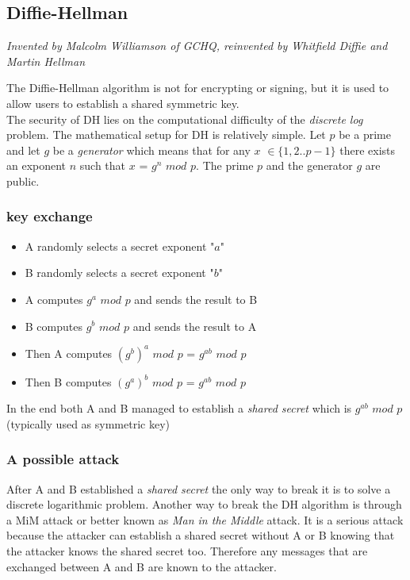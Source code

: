\documentclass{article}
\begin{document}
\subsection{Diffie-Hellman}
\begin{center}
   \textit{Invented by Malcolm Williamson of GCHQ, reinvented by Whitfield Diffie and Martin Hellman}
\end{center}
The Diffie-Hellman algorithm is not for encrypting or signing, but it is used to allow users to establish a shared symmetric key.\\
The security of DH lies on the computational difficulty of the \textit{discrete log} problem. The mathematical setup for DH is relatively simple. Let $p$ be a prime and let $g$ be a \textit{generator} which means that for any $x$ $\in \{1,2..p-1\}$ there exists an exponent $n$ such that $x$ = $g^n$ $mod$ $p$. The prime $p$ and the generator $g$ are public.

\subsubsection{key exchange}
\begin{itemize}
\item A randomly selects a secret exponent "$a$"
\item B randomly selects a secret exponent "$b$"
\item A computes $g^a$ $mod$ $p$ and sends the result to B
\item B computes $g^b$ $mod$ $p$ and sends the result to A
\item Then A computes $(g^b)^a$ $mod$ $p$ = $g^{ab}$ $mod$ $p$
\item Then B computes $(g^a)^b$ $mod$ $p$ = $g^{ab}$ $mod$ $p$
\end{itemize}{}
In the end both A and B managed to establish a \textit{shared secret} which is $g^{ab}$ $mod$ $p$ (typically used as symmetric key)

\subsubsection{A possible attack}
After A and B established a \textit{shared secret} the only way to break it is to solve a discrete logarithmic problem. Another way to break the DH algorithm is through a MiM attack or better known as \textit{Man in the Middle} attack. It is a serious attack because the attacker can establish a shared secret without A or B knowing that the attacker knows the shared secret too. Therefore any messages that are exchanged between A and B are known to the attacker.
\end{document}
